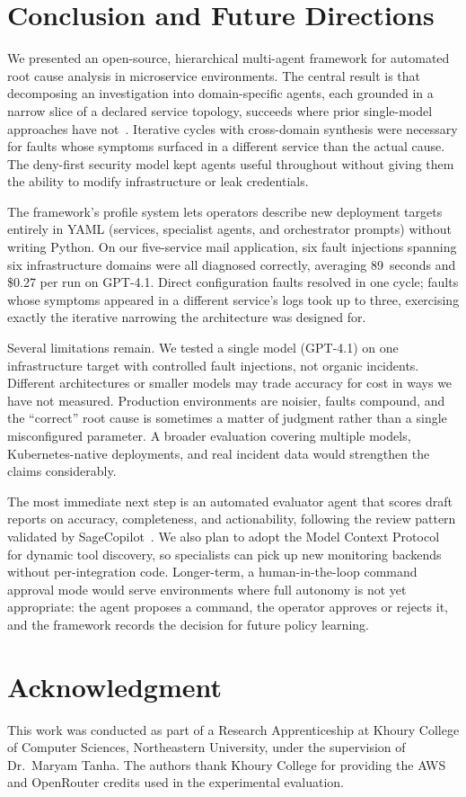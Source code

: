 \documentclass[conference]{IEEEtran}
\begin{document}
\section{Conclusion and Future Directions}

We presented an open-source, hierarchical multi-agent framework for
automated root cause analysis in microservice environments. The
central result is that decomposing an investigation into
domain-specific agents, each grounded in a narrow slice of a
declared service topology, succeeds where prior single-model
approaches have not~\cite{xu2025openrca}. Iterative cycles with
cross-domain synthesis were necessary for faults whose symptoms
surfaced in a different service than the actual cause. The
deny-first security model kept agents useful throughout without
giving them the ability to modify infrastructure or leak
credentials.

The framework's profile system lets operators describe new deployment
targets entirely in YAML (services, specialist agents, and
orchestrator prompts) without writing Python. On our five-service
mail application, six fault injections spanning six infrastructure
domains were all diagnosed correctly, averaging 89~seconds and
\$0.27 per run on GPT-4.1. Direct configuration faults resolved in
one cycle; faults whose symptoms appeared in a different service's
logs took up to three, exercising exactly the iterative narrowing the
architecture was designed for.

Several limitations remain. We tested a single model (GPT-4.1) on
one infrastructure target with controlled fault injections, not
organic incidents. Different architectures or smaller models may
trade accuracy for cost in ways we have not measured. Production
environments are noisier, faults compound, and the ``correct'' root
cause is sometimes a matter of judgment rather than a single
misconfigured parameter. A broader evaluation covering multiple
models, Kubernetes-native deployments, and real incident
data would strengthen the claims considerably.

The most immediate next step is an automated evaluator agent that
scores draft reports on accuracy, completeness, and actionability,
following the review pattern validated by
SageCopilot~\cite{liao2025sagecopilot}. We also plan to adopt the
Model Context Protocol~\cite{aws2025mcp_sre} for dynamic tool
discovery, so specialists can pick up new monitoring backends
without per-integration code. Longer-term, a human-in-the-loop
command approval mode would serve environments where full autonomy
is not yet appropriate: the agent proposes a command, the operator
approves or rejects it, and the framework records the decision for
future policy learning.


\section*{Acknowledgment}
This work was conducted as part of a Research Apprenticeship at
Khoury College of Computer Sciences, Northeastern University, under
the supervision of Dr.\ Maryam Tanha. The authors thank Khoury
College for providing the AWS and OpenRouter credits used in the
experimental evaluation.



\end{document}

